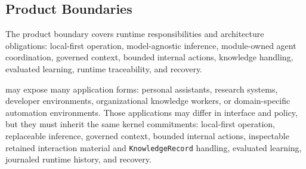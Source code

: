 \subsection{Product Boundaries}

The product boundary covers runtime responsibilities and architecture obligations: local-first operation, model-agnostic inference, module-owned agent coordination, governed context, bounded internal actions, knowledge handling, evaluated learning, runtime traceability, and recovery.

\Madre may expose many application forms: personal assistants, research systems, developer environments, organizational knowledge workers, or domain-specific automation environments. Those applications may differ in interface and policy, but they must inherit the same kernel commitments: local-first operation, replaceable inference, governed context, bounded internal actions, inspectable retained interaction material and \texttt{KnowledgeRecord} handling, evaluated learning, journaled runtime history, and recovery.
